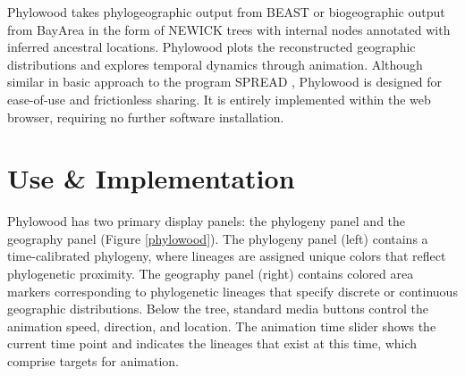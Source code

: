 \documentclass{bioinfo}
\begin{document}
Phylowood takes phylogeographic output from BEAST \citep{drummond12} or biogeographic output from BayArea \citep{landis13} in the form of NEWICK trees with internal nodes annotated with inferred ancestral locations.
Phylowood plots the reconstructed geographic distributions and explores temporal dynamics through animation.
Although similar in basic approach to the program SPREAD \citep{bielejec11}, Phylowood is designed for ease-of-use and frictionless sharing.
It is entirely implemented within the web browser, requiring no further software installation.

\section{Use \& Implementation}
Phylowood has two primary display panels: the phylogeny panel and the geography panel (Figure \ref{phylowood}). The phylogeny panel (left) contains a time-calibrated phylogeny, where lineages are assigned unique colors that reflect phylogenetic proximity. The geography panel (right) contains colored area markers corresponding to phylogenetic lineages that specify discrete or continuous geographic distributions. Below the tree, standard media buttons control the animation speed, direction, and location. The animation time slider shows the current time point and indicates the lineages that exist at this time, which comprise targets for animation.
\end{document}
